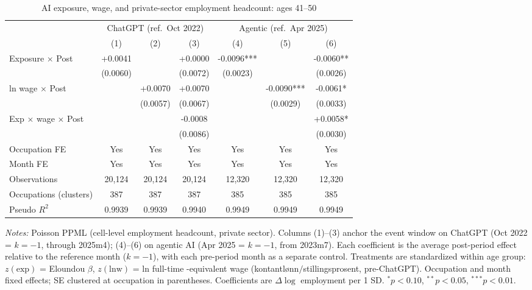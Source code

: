 \begin{table}[htbp]\centering
\caption{AI exposure, wage, and private-sector employment headcount: ages 41–50}
\label{tab:ca_did_age3}
\small
\begin{tabular}{lcccccc}
\toprule
 & \multicolumn{3}{c}{ChatGPT (ref.\ Oct 2022)} & \multicolumn{3}{c}{Agentic (ref.\ Apr 2025)} \\
\cmidrule(lr){2-4} \cmidrule(lr){5-7}
 & (1) & (2) & (3) & (4) & (5) & (6) \\
\midrule
Exposure $\times$ Post & +0.0041 &  & +0.0000 & -0.0096*** &  & -0.0060** \\
 & (0.0060) &  & (0.0072) & (0.0023) &  & (0.0026) \\
ln wage $\times$ Post &  & +0.0070 & +0.0070 &  & -0.0090*** & -0.0061* \\
 &  & (0.0057) & (0.0067) &  & (0.0029) & (0.0033) \\
Exp $\times$ wage $\times$ Post &  &  & -0.0008 &  &  & +0.0058* \\
 &  &  & (0.0086) &  &  & (0.0030) \\
\midrule
Occupation FE & Yes & Yes & Yes & Yes & Yes & Yes \\
Month FE & Yes & Yes & Yes & Yes & Yes & Yes \\
Observations & 20,124 & 20,124 & 20,124 & 12,320 & 12,320 & 12,320 \\
Occupations (clusters) & 387 & 387 & 387 & 385 & 385 & 385 \\
Pseudo $R^2$ & 0.9939 & 0.9939 & 0.9940 & 0.9949 & 0.9949 & 0.9949 \\
\bottomrule
\end{tabular}
\begin{minipage}{\linewidth}\vspace{2pt}\footnotesize
\emph{Notes:} Poisson PPML (cell-level employment headcount, private sector). Columns (1)--(3) anchor the event window on ChatGPT (Oct 2022 = $k{=}{-}1$, through 2025m4); (4)--(6) on agentic AI (Apr 2025 = $k{=}{-}1$, from 2023m7). Each coefficient is the average post-period effect relative to the reference month ($k{=}{-}1$), with each pre-period month as a separate control. Treatments are standardized within age group: $z(\text{exp})$ = Eloundou $\beta$, $z(\text{lnw})$ = ln full-time -equivalent wage (kontantl\o nn$/$stillingsprosent, pre-ChatGPT). Occupation and month fixed effects; SE clustered at occupation in parentheses. Coefficients are $\Delta\log$ employment per 1 SD. $^{*}p<0.10$, $^{**}p<0.05$, $^{***}p<0.01$.
\end{minipage}
\end{table}